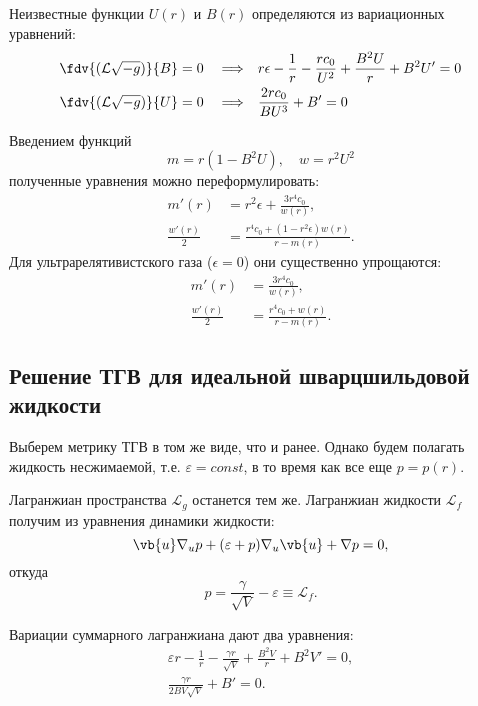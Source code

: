 \documentclass[\docroot/reports/draft/report.tex]{subfiles}
\begin{document}
    Неизвестные функции $U(r)$ и $B(r)$ определяются из вариационных уравнений:
    \begin{align*}
        \fdv{(\mathcal{L}\sqrt{-g})}{B} = 0 \quad\Longrightarrow\quad&
            r \epsilon - \frac{1}{r} - \frac{r c_0}{U^2} + \frac{B^2 U}{r} + B^2 U' = 0 \\
        \fdv{(\mathcal{L}\sqrt{-g})}{U} = 0 \quad\Longrightarrow\quad&
            \frac{2 r c_0}{B U^3} + B' = 0
    \end{align*}

    Введением функций
    \begin{equation*}
        m = r (1 - B^2 U) , \quad w = r^2 U^2
    \end{equation*}
    полученные уравнения можно переформулировать:
    \begin{align*}
        m'(r) &= r^2 \epsilon + \frac{3 r^4 c_0}{w(r)} , \\
        \frac{w'(r)}{2} &= \frac{r^4 c_0 + (1 - r^2 \epsilon) w(r)}{r - m(r)} .
    \end{align*}
    Для ультрарелятивистского газа ($\epsilon = 0$) они существенно упрощаются:
    \begin{align*}
        m'(r) &= \frac{3 r^4 c_0}{w(r)} , \\
        \frac{w'(r)}{2} &= \frac{r^4 c_0 + w(r)}{r - m(r)} .
    \end{align*}

\subsection{Решение ТГВ для идеальной шварцшильдовой жидкости}

    Выберем метрику ТГВ в том же виде, что и ранее. Однако будем полагать жидкость несжимаемой, т.е. $\varepsilon = const$, в то время как все еще $p = p(r)$.

    Лагранжиан пространства $\mathcal{L}_g$ останется тем же. Лагранжиан жидкости $\mathcal{L}_f$ получим из уравнения динамики жидкости:
    \begin{equation*}
        \vb{u} \nabla_u p + (\varepsilon + p) \nabla_u \vb{u} + \nabla p = 0 ,
    \end{equation*}
    откуда
    \begin{equation*}
        p = \frac{\gamma}{\sqrt{V}} - \varepsilon \equiv \mathcal{L}_f .
    \end{equation*}

    Вариации суммарного лагранжиана дают два уравнения:
    \begin{gather*}
        \varepsilon r - \frac{1}{r} - \frac{\gamma r}{\sqrt{V}} + \frac{B^2 V}{r} + B^2 V' = 0 , \\
        \frac{\gamma r}{2 B V \sqrt{V}} + B' = 0 .
    \end{gather*}
\end{document}
